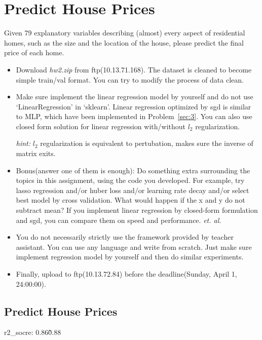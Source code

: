 \documentclass[12pt]{article}
\begin{document}
\newpage 
\section{Predict House Prices} \label{sec:4}
Given 79 explanatory variables describing (almost) every aspect of residential homes, such as the size  and the location of the house, please predict the final price of each home.

\begin{itemize}
	\item  Download \textit{hw2.zip} from ftp(10.13.71.168). The dataset is cleaned to become simple train/val format. You can try to modify the process of data clean.
	\item Make sure implement the {linear} regression model by yourself and do not use {{`LinearRegression' in `sklearn'}}.  Linear regression optimized by sgd is similar to MLP, which have been implemented in {Problem~\ref{sec:3}}. You can also use closed form solution for linear regression with/without $l_2$ regularization. 

	\textit{hint:} $l_2$ regularization is equivalent to pertubation, makes sure the inverse of matrix exits.

	\item {{Bonus(answer one of them is enough)}}: Do something extra surrounding the topics in this assignment, using the code you developed. For example, try lasso regression and/or huber loss and/or learning rate decay and/or select best model by cross validation. What would happen if the x and y do not subtract mean? If you implement linear  regression by  closed-form formulation and sgd, you can compare them on speed and performance. \textit{et. al.} 

	\item You do not necessarily strictly use the framework provided by teacher assistant. You can use any language and write from scratch. Just make sure implement regression model by yourself and then do similar experiments.
	\item Finally, upload to ftp(10.13.72.84) before the deadline(Sunday, April 1, 24:00:00).
\end{itemize}

\subsection{Predict House Prices}

r2\_socre: 0.86\~0.88
\end{document}
